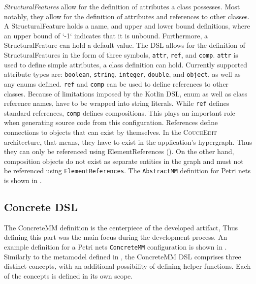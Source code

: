
% 


% 

\emph{StructuralFeatures} allow for the definition of attributes a class possesses. Most notably, they allow for the definition of attributes and references to other classes. A StructuralFeature holds a name, and upper and lower bound definitions, where an upper bound of `-1` indicates that it is unbound. Furthermore, a StructuralFeature can hold a default value. The DSL allows for the definition of StructuralFeatures in the form of three symbols, \texttt{attr}, \texttt{ref}, and \texttt{comp}. \texttt{attr} is used to define simple attributes, a class definition can hold. Currently supported attribute types are: \texttt{boolean}, \texttt{string}, \texttt{integer}, \texttt{double}, and \texttt{object}, as well as any enums defined. \texttt{ref} and \texttt{comp} can be used to define references to other classes. Because of limitations imposed by the Kotlin DSL, enum as well as class reference names, have to be wrapped into string literals. While \texttt{ref} defines standard references, \texttt{comp} defines compositions. This plays an important role when generating source code from this configuration. References define connections to objects that can exist by themselves. In the \textsc{CouchEdit} architecture, that means, they have to exist in the application's hypergraph. Thus they can only be referenced using ElementReferences (). On the other hand, composition objects do not exist as separate entities in the graph and must not be referenced using \texttt{ElementReferences}. The \texttt{AbstractMM} definition for Petri nets is shown in .

\subsection{Concrete DSL}
The ConcreteMM definition is the centerpiece of the developed artifact, Thus defining this part was the main focus during the development process. An example definition for a Petri nets \texttt{ConcreteMM} configuration is shown in . Similarly to the metamodel defined in , the ConcreteMM DSL comprises three distinct concepts, with an additional possibility of defining helper functions. Each of the concepts is defined in its own scope. 


